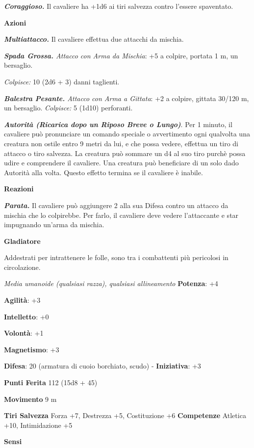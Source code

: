 \begin{multicols}{2}
\emph{\textbf{Coraggioso.}} Il cavaliere ha +1d6 ai tiri salvezza
contro l'essere spaventato.

\smallskip\textbf{Azioni}

\emph{\textbf{Multiattacco.}} Il cavaliere effettua due attacchi da
mischia.

\emph{\textbf{Spada Grossa.} Attacco con Arma da Mischia}: +5 a colpire,
portata 1 m, un bersaglio.

\emph{Colpisce:} 10 (2d6 + 3) danni taglienti.

\emph{\textbf{Balestra Pesante.} Attacco con Arma a Gittata}: +2 a
colpire, gittata 30/120 m, un bersaglio. \emph{Colpisce:} 5 (1d10)
perforanti.

\emph{\textbf{Autorità (Ricarica dopo un Riposo Breve o Lungo)}}. Per 1
minuto, il cavaliere può pronunciare un comando speciale o avvertimento
ogni qualvolta una creatura non ostile entro 9 metri da lui, e che possa
vedere, effettua un tiro di attacco o tiro salvezza. La creatura può
sommare un d4 al suo tiro purchè possa udire e comprendere il cavaliere.
Una creatura può beneficiare di un solo dado Autorità alla volta. Questo
effetto termina se il cavaliere è inabile.

\textbf{Reazioni}

\emph{\textbf{Parata.}} Il cavaliere può aggiungere 2 alla sua Difesa contro
un attacco da mischia che lo colpirebbe. Per farlo, il cavaliere deve
vedere l'attaccante e star impugnando un'arma da mischia.



\textbf{Gladiatore}

Addestrati per intrattenere le folle, sono tra i combattenti più
pericolosi in circolazione.

\emph{Media umanoide (qualsiasi razza), qualsiasi allineamento}
\textbf{Potenza}: +4

\textbf{Agilità}: +3

\textbf{Intelletto}: +0

\textbf{Volontà}: +1

\textbf{Magnetismo}: +3

\textbf{Difesa}: 20 (armatura di cuoio borchiato, scudo) - \textbf{Iniziativa}: +3

\textbf{Punti Ferita} 112 (15d8 + 45)

\textbf{Movimento} 9 m

\textbf{Tiri Salvezza} Forza +7, Destrezza +5, Costituzione +6
\textbf{Competenze} Atletica +10, Intimidazione +5

\textbf{Sensi} 


\end{multicols}
